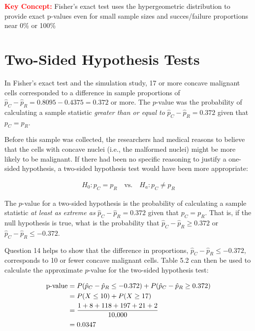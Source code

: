 \documentclass[
]{report}
\begin{document}
\Large

\textbf{\textcolor{red}{Key Concept:}}
\color{red}Fisher's exact test uses the hypergeometric distribution to provide exact p-values even for small sample sizes and succes/failure proportions near 0\% or 100\%
\color{black}
\normalsize

\hypertarget{two-sided-hypothesis-tests}{%
\section{\texorpdfstring{\textbf{Two-Sided Hypothesis Tests}}{Two-Sided Hypothesis Tests}}\label{two-sided-hypothesis-tests}}

In Fisher's exact test and the simulation study, 17 or more concave malignant cells corresponded to a difference in sample proportions of \(\hat p_C - \hat p_R = 0.8095 - 0.4375 = 0.372\) or more. The \(p\)-value was the probability of calculating a sample statistic \emph{greater than or equal to} \(\hat p_C - \hat p_R = 0.372\) given that \(p_C = p_R\).

Before this sample was collected, the researchers had medical reasons to believe that the cells with concave nuclei (i.e., the malformed nuclei) might be more likely to be malignant. If there had been no specific reasoning to justify a one-sided hypothesis, a two-sided hypothesis test would have been more appropriate:

\begin{align}\label{5.2}
H_0: p_C = p_R \quad\text{vs.}\quad H_a: p_C \neq p_R 
\tag{5.2}
\end{align}

The \(p\)-value for a two-sided hypothesis is the probability of calculating a sample statistic \emph{at least as extreme as} \(\hat p_C - \hat p_R = 0.372\) given that \(p_C = p_R\). That is, if the null hypothesis is true, what is the probability that \(\hat p_C - \hat p_R \ge 0.372\) or \(\hat p_C - \hat p_R \le -0.372\).

Question 14 helps to show that the difference in proportions, \(\hat p_C - \hat p_R \le -0.372\), corresponds to 10 or fewer concave malignant cells. Table 5.2 can then be used to calculate the approximate \(p\)-value for the two-sided hypothesis test:

\begin{align}
\text{p-value}
&= P(\hat p_C - \hat p_R \le -0.372) + P(\hat p_C - \hat p_R \ge 0.372) \notag \\ \notag
&= P(X \le 10) + P(X \ge 17) \\ \notag 
&= \frac{1 + 8 + 118 + 197 + 21 + 2}{10{,}000} \\ \notag
&= 0.0347 \notag
\end{align}
\end{document}
